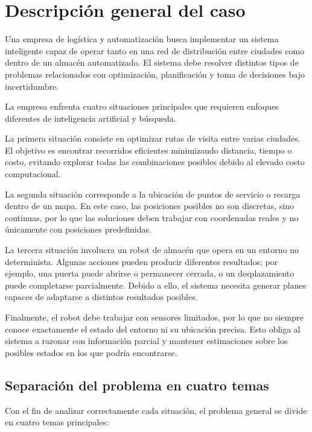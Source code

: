 
\section{Descripción general del caso}

Una empresa de logística y automatización busca implementar un sistema inteligente capaz de operar tanto en una red de distribución entre ciudades como dentro de un almacén automatizado. El sistema debe resolver distintos tipos de problemas relacionados con optimización, planificación y toma de decisiones bajo incertidumbre.

La empresa enfrenta cuatro situaciones principales que requieren enfoques diferentes de inteligencia artificial y búsqueda.

La primera situación consiste en optimizar rutas de visita entre varias ciudades. El objetivo es encontrar recorridos eficientes minimizando distancia, tiempo o costo, evitando explorar todas las combinaciones posibles debido al elevado costo computacional.

La segunda situación corresponde a la ubicación de puntos de servicio o recarga dentro de un mapa. En este caso, las posiciones posibles no son discretas, sino continuas, por lo que las soluciones deben trabajar con coordenadas reales y no únicamente con posiciones predefinidas.

La tercera situación involucra un robot de almacén que opera en un entorno no determinista. Algunas acciones pueden producir diferentes resultados; por ejemplo, una puerta puede abrirse o permanecer cerrada, o un desplazamiento puede completarse parcialmente. Debido a ello, el sistema necesita generar planes capaces de adaptarse a distintos resultados posibles.

Finalmente, el robot debe trabajar con sensores limitados, por lo que no siempre conoce exactamente el estado del entorno ni su ubicación precisa. Esto obliga al sistema a razonar con información parcial y mantener estimaciones sobre los posibles estados en los que podría encontrarse.

\subsection{Separación del problema en cuatro temas}

Con el fin de analizar correctamente cada situación, el problema general se divide en cuatro temas principales:

